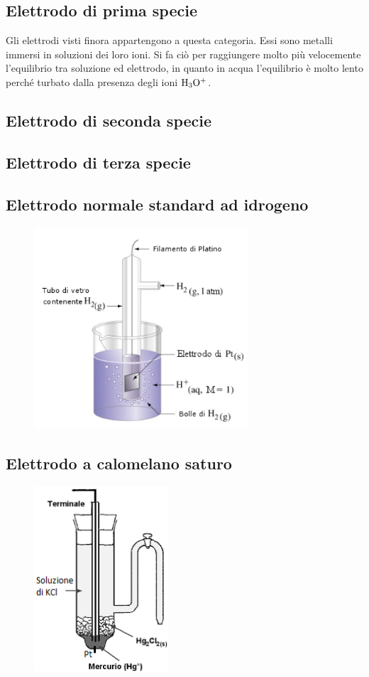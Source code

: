\subsection{Elettrodo di prima specie}
Gli elettrodi visti finora appartengono a questa categoria. Essi sono metalli immersi in soluzioni dei loro ioni. Si fa ciò per raggiungere molto più velocemente l'equilibrio tra soluzione ed elettrodo, in quanto in acqua l'equilibrio è molto lento perché turbato dalla presenza degli ioni $\rm H_3O^+$.
\subsection{Elettrodo di seconda specie}
\subsection{Elettrodo di terza specie}
\subsection{Elettrodo normale standard ad idrogeno}

\begin{figure}
    \centering
    \includegraphics[width=8cm]{immagini/Elettrodo_a_idrogeno.png}
\end{figure}
\subsection{Elettrodo a calomelano saturo}
\begin{figure}
    \centering
    \includegraphics[width=5cm]{immagini/Elettrodo_a_calomelano.png}
\end{figure}
